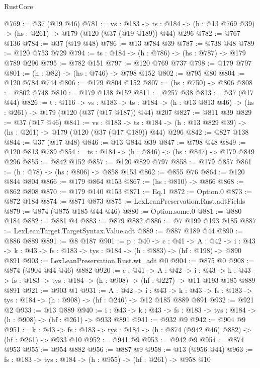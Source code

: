 \begin{lexlean}{RustCore}
\begin{coremodule}
@769 := @37 (@19 @46)
@781 := {vs : @183} ->
  {ts : @184} -> (h : @13 @769 @39) -> (hs : @261) -> @179 (@120 (@37 (@19 @189)) @44) @296
@782 := @767 @136
@784 := @37 (@19 @48)
@786 := @13 @784 @39
@787 := @738 @48
@789 := @120 @753 @729
@794 := {ts : @184} -> (h : @786) -> (hs : @787) -> @179 @789 @296
@795 := @782 @151
@797 := @120 @769 @737
@798 := @179 @797
@801 := (h : @82) -> (hs : @746) -> @798 @152
@802 := @795 @80
@804 := @120 @784 @744
@806 := @179 @804 @152
@807 := (hs : @750) -> @806
@808 := @802 @748
@810 := @179 @138 @152
@811 := @257 @38
@813 := @37 (@17 @44)
@826 := {t : @116} ->
  {vs : @183} ->
  {ts : @184} -> (h : @13 @813 @46) -> (hs : @261) -> @179 (@120 (@37 (@17 @187)) @44) @207
@827 := @811 @39
@829 := @37 (@17 @46)
@841 := {vs : @183} ->
  {ts : @184} -> (h : @13 @829 @39) -> (hs : @261) -> @179 (@120 (@37 (@17 @189)) @44) @296
@842 := @827 @138
@844 := @37 (@17 @48)
@846 := @13 @844 @39
@847 := @798 @48
@849 := @120 @813 @789
@854 := {ts : @184} -> (h : @846) -> (hs : @847) -> @179 @849 @296
@855 := @842 @152
@857 := @120 @829 @797
@858 := @179 @857
@861 := (h : @78) -> (hs : @806) -> @858 @153
@862 := @855 @76
@864 := @120 @844 @804
@866 := @179 @864 @153
@867 := (hs : @810) -> @866
@868 := @862 @808
@870 := @179 @140 @153
@871 := Eq.{1}
@872 := Option.{0}
@873 := @872 @184
@874 := @871 @873
@875 := LexLeanPreservation.Rust.adtFields
@879 := @874 (@875 @185 @44 @46)
@880 := Option.some.{0}
@881 := @880 @184
@882 := @881 @4
@883 := @879 @882
@886 := @7 @199 @193 @185
@887 := LexLeanTarget.TargetSyntax.Value.adt
@889 := @887 @189 @44
@890 := @886 @889
@891 := @8 @187
@901 := {p : @40} ->
  {c : @41} ->
  {A : @42} ->
  {i : @43} -> {k : @43} -> {fs : @183} -> {tys : @184} -> (h : @883) -> (hf : @198) -> @890 @891
@903 := LexLeanPreservation.Rust.wt_adt @0
@904 := @875 @0
@908 := @874 (@904 @44 @46) @882
@920 := {c : @41} ->
  {A : @42} ->
  {i : @43} ->
  {k : @43} -> {fs : @183} -> {tys : @184} -> (h : @908) -> (hf : @227) -> @11 @193 @185 @889 @891
@921 := @903 @1
@931 := {A : @42} ->
  {i : @43} ->
  {k : @43} -> {fs : @183} -> {tys : @184} -> (h : @908) -> (hf : @246) -> @12 @185 @889 @891
@932 := @921 @2
@933 := @13 @889
@940 := {i : @43} ->
  {k : @43} -> {fs : @183} -> {tys : @184} -> (h : @908) -> (hf : @261) -> @933 @891
@941 := @932 @9
@942 := @904 @9
@951 := {k : @43} ->
  {fs : @183} -> {tys : @184} -> (h : @874 (@942 @46) @882) -> (hf : @261) -> @933 @10
@952 := @941 @9
@953 := @942 @9
@954 := @874 @953
@955 := @954 @882
@956 := @887 @9
@958 := @13 (@956 @44)
@963 := {fs : @183} -> {tys : @184} -> (h : @955) -> (hf : @261) -> @958 @10

\end{coremodule}
\end{lexlean}
